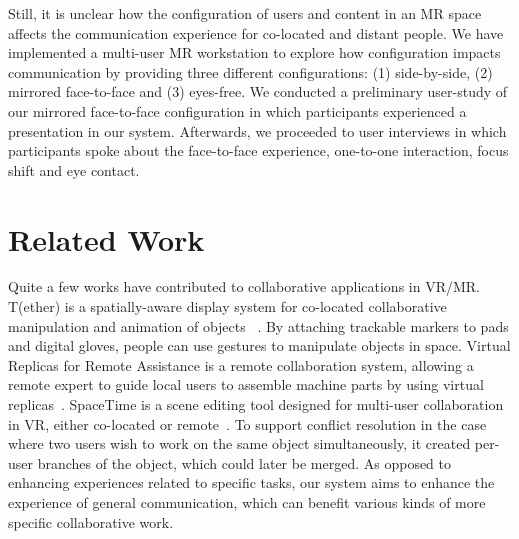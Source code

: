 \documentclass[sigchi-a]{acmart}
\begin{document}
Still, it is unclear how the configuration of users and content in an MR space affects the communication experience for co-located and distant people.
We have implemented a multi-user MR workstation to explore how configuration impacts communication by providing three different configurations: (1) side-by-side, (2) mirrored face-to-face and (3) eyes-free. We conducted a preliminary user-study of our mirrored face-to-face configuration in which participants experienced a presentation in our system.
Afterwards, we proceeded to user interviews in which participants spoke about the face-to-face experience, one-to-one interaction, focus shift and eye contact. %

\section{Related Work}
Quite a few works have contributed to collaborative applications in VR/MR. T(ether) is a spatially-aware display system for co-located collaborative manipulation and animation of objects ~\cite{lakatos2014t}. By attaching trackable markers to pads and digital gloves, people can use gestures to manipulate objects in space. Virtual Replicas for Remote Assistance is a remote collaboration system, allowing a remote expert to guide local users to assemble machine parts by using virtual replicas~\cite{oda2015virtual}.
SpaceTime is a scene editing tool designed for multi-user collaboration in VR, either co-located or remote~\cite{xia2018spacetime}. To support conflict resolution in the case where two users wish to work on the same object simultaneously, it created per-user branches of the object, which could later be merged. 
As opposed to enhancing experiences related to specific tasks, our system aims to enhance the experience of general communication, which can benefit various kinds of more specific collaborative work.
\end{document}
